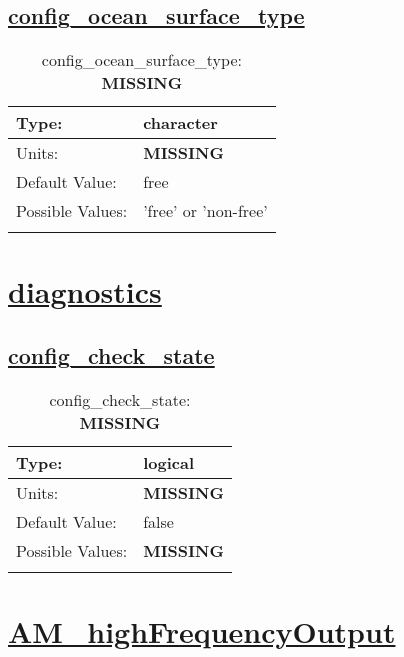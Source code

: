 \subsection[config\_ocean\_surface\_type]{\hyperref[sec:nm_tab_ocean]{config\_ocean\_surface\_type}}
\label{subsec:nm_sec_config_ocean_surface_type}
\begin{center}
\begin{longtable}{| p{2.0in} || p{4.0in} |}
    \hline
    Type: & character \\
    \hline
    Units: & {\bf \color{red} MISSING} \\
    \hline
    Default Value: & free \\
    \hline
    Possible Values: & 'free' or 'non-free' \\
    \hline
    \caption{config\_ocean\_surface\_type: {\bf \color{red} MISSING}}
\end{longtable}
\end{center}
\section[diagnostics]{\hyperref[sec:nm_tab_diagnostics]{diagnostics}}
\label{sec:nm_sec_diagnostics}
\subsection[config\_check\_state]{\hyperref[sec:nm_tab_diagnostics]{config\_check\_state}}
\label{subsec:nm_sec_config_check_state}
\begin{center}
\begin{longtable}{| p{2.0in} || p{4.0in} |}
    \hline
    Type: & logical \\
    \hline
    Units: & {\bf \color{red} MISSING} \\
    \hline
    Default Value: & false \\
    \hline
    Possible Values: & {\bf \color{red} MISSING} \\
    \hline
    \caption{config\_check\_state: {\bf \color{red} MISSING}}
\end{longtable}
\end{center}
\section[AM\_highFrequencyOutput]{\hyperref[sec:nm_tab_AM_highFrequencyOutput]{AM\_highFrequencyOutput}}
\label{sec:nm_sec_AM_highFrequencyOutput}
